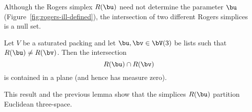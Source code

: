 
\figELMXAFH %

Although the Rogers simplex $R(\bu)$ need not determine the parameter
$\bu$ (Figure~\ref{fig:rogers-ill-defined}), the intersection of two
different Rogers simplices is a null set.

\begin{lemma}  \label{lemma:R-inter} 
  Let $V$ be a saturated packing and let $\bu,\bv\in \bV(3)$ be lists
  such that $R(\bu)\ne R(\bv)$.  Then the intersection
\[  
R(\bu)\cap R(\bv)
\] 
is contained in a plane (and hence has measure zero).
\end{lemma}

This result and the previous lemma show that the simplices $R(\bu)$
partition Euclidean three-space.

